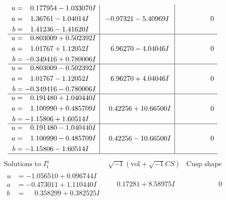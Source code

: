\documentclass[1p]{elsarticle_modified}
\theoremstyle{definition}
\newcommand{\I}{\sqrt{-1}}
\begin{document}
$$\begin{array}{c|c|c}
\begin{aligned}
u &= \phantom{-}0.177954 - 1.033070 I \\
a &= \phantom{-}1.36761 - 1.04014 I \\
b &= \phantom{-}1.41236 - 1.41620 I\end{aligned}
 & -0.97321 - 5.40969 I & \phantom{-0.000000 } 0 \\ \hline\begin{aligned}
u &= \phantom{-}0.803009 + 0.502392 I \\
a &= \phantom{-}1.01767 + 1.12052 I \\
b &= -0.349416 + 0.780006 I\end{aligned}
 & \phantom{-}6.96270 - 4.04046 I & \phantom{-0.000000 } 0 \\ \hline\begin{aligned}
u &= \phantom{-}0.803009 - 0.502392 I \\
a &= \phantom{-}1.01767 - 1.12052 I \\
b &= -0.349416 - 0.780006 I\end{aligned}
 & \phantom{-}6.96270 + 4.04046 I & \phantom{-0.000000 } 0 \\ \hline\begin{aligned}
u &= \phantom{-}0.191480 + 1.040440 I \\
a &= \phantom{-}1.100990 + 0.485709 I \\
b &= -1.15806 + 1.60514 I\end{aligned}
 & \phantom{-}0.42256 + 10.66500 I & \phantom{-0.000000 } 0 \\ \hline\begin{aligned}
u &= \phantom{-}0.191480 - 1.040440 I \\
a &= \phantom{-}1.100990 - 0.485709 I \\
b &= -1.15806 - 1.60514 I\end{aligned}
 & \phantom{-}0.42256 - 10.66500 I & \phantom{-0.000000 } 0\\
 \hline 
 \end{array}$$\newpage$$\begin{array}{c|c|c}  
\text{Solutions to }I^u_{1}& \I (\text{vol} + \sqrt{-1}CS) & \text{Cusp shape}\\
 \hline 
\begin{aligned}
u &= -1.056510 + 0.096744 I \\
a &= -0.473011 + 1.110440 I \\
b &= \phantom{-}0.358299 + 0.382525 I\end{aligned}
 & \phantom{-}0.17281 + 8.58975 I & \phantom{-0.000000 } 0 \\ \hline\begin{aligned}

\end{aligned}
\end{array}$$
\end{document}
